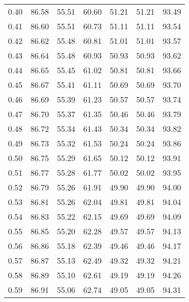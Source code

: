 \begin{tabular}{|c|c|c|c|c|c|c|}
      0.40 &     86.58 &     55.51 &      60.60 &   51.21 &      51.21 &         93.49 \\
      0.41 &     86.60 &     55.51 &      60.73 &   51.11 &      51.11 &         93.54 \\
      0.42 &     86.62 &     55.48 &      60.81 &   51.01 &      51.01 &         93.57 \\
      0.43 &     86.64 &     55.48 &      60.93 &   50.93 &      50.93 &         93.62 \\
      0.44 &     86.65 &     55.45 &      61.02 &   50.81 &      50.81 &         93.66 \\
      0.45 &     86.67 &     55.41 &      61.11 &   50.69 &      50.69 &         93.70 \\
      0.46 &     86.69 &     55.39 &      61.23 &   50.57 &      50.57 &         93.74 \\
      0.47 &     86.70 &     55.37 &      61.35 &   50.46 &      50.46 &         93.79 \\
      0.48 &     86.72 &     55.34 &      61.43 &   50.34 &      50.34 &         93.82 \\
      0.49 &     86.73 &     55.32 &      61.53 &   50.24 &      50.24 &         93.86 \\
      0.50 &     86.75 &     55.29 &      61.65 &   50.12 &      50.12 &         93.91 \\
      0.51 &     86.77 &     55.28 &      61.77 &   50.02 &      50.02 &         93.95 \\
      0.52 &     86.79 &     55.26 &      61.91 &   49.90 &      49.90 &         94.00 \\
      0.53 &     86.81 &     55.26 &      62.04 &   49.81 &      49.81 &         94.04 \\
      0.54 &     86.83 &     55.22 &      62.15 &   49.69 &      49.69 &         94.09 \\
      0.55 &     86.85 &     55.20 &      62.28 &   49.57 &      49.57 &         94.13 \\
      0.56 &     86.86 &     55.18 &      62.39 &   49.46 &      49.46 &         94.17 \\
      0.57 &     86.87 &     55.13 &      62.49 &   49.32 &      49.32 &         94.21 \\
      0.58 &     86.89 &     55.10 &      62.61 &   49.19 &      49.19 &         94.26 \\
      0.59 &     86.91 &     55.06 &      62.74 &   49.05 &      49.05 &         94.31 \\

\end{tabular}
